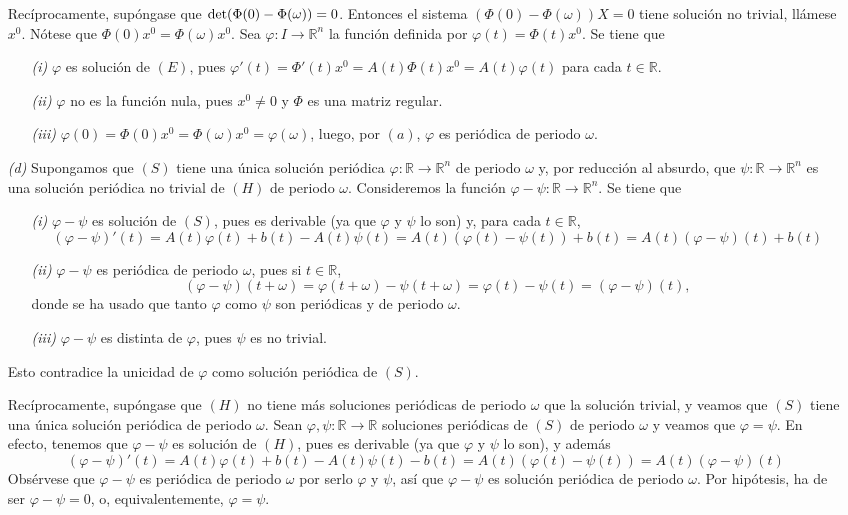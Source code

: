 \documentclass[11pt]{report}
\newcommand{\R}{\mathbb R}
\begin{document}
\begin{itemize}
    Recíprocamente, supóngase que $\textup{det}(\Phi(0)-\Phi(\omega)) =0$. Entonces el sistema $(\Phi(0)-\Phi(\omega))X=0$ tiene solución no trivial, llámese $x^0$. Nótese que $\Phi(0)x^0=\Phi(\omega)x^0$. Sea $\varphi \colon I \to \R^n$ la función definida por $\varphi(t) = \Phi(t) x^0$. Se tiene que
    \begin{itemize}
        \item[\textit{(i)}] $\varphi$ es solución de $(E)$, pues $\varphi'(t) = \Phi'(t)x^0 = A(t)\Phi(t)x^0=A(t)\varphi(t)$ para cada $t \in \R$.
        \item[\textit{(ii)}] $\varphi$ no es la función nula, pues $x^0 \neq 0$ y $\Phi$ es una matriz regular.
        \item[\textit{(iii)}] $\varphi(0) = \Phi(0)x^0=\Phi(\omega)x^0=\varphi(\omega)$, luego, por $(a)$, $\varphi$ es periódica de periodo $\omega$.
    \end{itemize}
    \item[\textit{(d)}] Supongamos que $(S)$ tiene una única solución periódica $\varphi \colon \R \to \R^n$ de periodo $\omega$ y, por reducción al absurdo, que $\psi \colon \R \to \R^n$ es una solución periódica no trivial de $(H)$ de periodo $\omega$. Consideremos la función $\varphi - \psi \colon \R \to \R^n$. Se tiene que
    \begin{itemize}
        \item[\textit{(i)}] $\varphi - \psi$ es solución de $(S)$, pues es derivable (ya que $\varphi$ y $\psi$ lo son) y, para cada $t \in \R$,
        \[(\varphi-\psi)'(t)= A(t)\varphi(t)+b(t)-A(t)\psi(t)=A(t)(\varphi(t)-\psi(t))+b(t)=A(t)(\varphi-\psi)(t)+b(t)\]
        \item[\textit{(ii)}] $\varphi-\psi$ es periódica de periodo $\omega$, pues si $t \in \R$,
        \[(\varphi-\psi)(t+\omega)=\varphi(t+\omega)-\psi(t+\omega)=\varphi(t)-\psi(t)=(\varphi-\psi)(t),\]
        donde se ha usado que tanto $\varphi$ como $\psi$ son periódicas y de periodo $\omega$.
        \item[\textit{(iii)}] $\varphi-\psi$ es distinta de $\varphi$, pues $\psi$ es no trivial.
    \end{itemize}
    Esto contradice la unicidad de $\varphi$ como solución periódica de $(S)$.

    \vspace{2mm}

    Recíprocamente, supóngase que $(H)$ no tiene más soluciones periódicas de periodo $\omega$ que la solución trivial, y veamos que $(S)$ tiene una única solución periódica de periodo $\omega$. Sean $\varphi, \psi \colon \R \to \R$ soluciones periódicas de $(S)$ de periodo $\omega$ y veamos que $\varphi = \psi$. En efecto, tenemos que $\varphi-\psi$ es solución de $(H)$, pues es derivable (ya que $\varphi$ y $\psi$ lo son), y además
    \[(\varphi-\psi)'(t)=A(t)\varphi(t)+b(t)-A(t)\psi(t)-b(t)=A(t)(\varphi(t)-\psi(t))=A(t)(\varphi-\psi)(t)\]
    Obsérvese que $\varphi-\psi$ es periódica de periodo $\omega$ por serlo $\varphi$ y $\psi$, así que $\varphi-\psi$ es solución periódica de periodo $\omega$. Por hipótesis, ha de ser $\varphi-\psi=0$, o, equivalentemente, $\varphi=\psi$.
\end{itemize}
\end{document}
